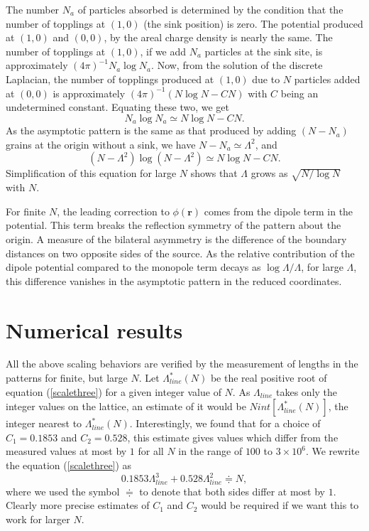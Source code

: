 \documentclass[11pt,a4paper]{book}
\begin{document}
The number $N_a$ of particles absorbed is determined by the condition that the number
of topplings at $(1,0)$ (the sink position) is zero. The potential produced at $(1,0)$ and $(0,0)$, by the
areal charge density is nearly the same. The number of topplings
at $(1,0)$, if we add $N_a$ particles at the sink site, is approximately $\left (4 \pi\right )^{-1} N_a \log N_a$.
Now, from the solution of the discrete Laplacian, the number of topplings produced at
$(1,0)$ due to $N$ particles added at $(0,0)$ is approximately $\left( 4\pi \right)^{-1}\left (N \log N -C N\right )$ with
$C$ being an undetermined constant. Equating these two, we get
\begin{equation}
 N_a \log N_a  \simeq   N \log N - C N.
\label{nans}
\end{equation}
As the asymptotic pattern is the same as that produced by adding $\left( N-N_{a} \right)$
grains at the origin without a sink, we have $N - N_a \simeq \Lambda^2$, and
\begin{equation}
(N -\Lambda^{2})\log ( N -\Lambda^2) \simeq  N \log N - C N.
\label{scaleone}
\end{equation} 
Simplification of this equation for large $N$ shows that $\Lambda$ grows as $\sqrt{N/\log N}$ with $N$. 

For finite $N$, the leading  correction to $\phi\left( \mathbf{r} \right)$ comes from
the dipole term in the potential. This term breaks the reflection 
symmetry of the pattern about the origin. A measure of the bilateral asymmetry is the
difference of the boundary distances on two opposite sides of the source.
As the relative contribution of the dipole potential compared to the monopole
term decays as $\log \Lambda/\Lambda$, for large $\Lambda$, this difference
vanishes in the asymptotic pattern in the reduced coordinates.

\section{Numerical results}\label{ch3.4}
All the above scaling behaviors are verified by the measurement of lengths in the patterns
for finite, but large $N$. Let $\Lambda^{\ast}_{line}\left( N \right)$ be the real positive root of
equation (\ref{scalethree}) for a given integer value of $N$. As
$\Lambda_{line}$ takes only the integer values on the lattice, an estimate of
it would be $Nint\left[ \Lambda^{\ast}_{line}(N) \right]$, the integer nearest
to $\Lambda^{\ast}_{line}\left( N \right)$.
Interestingly, we found that for
a choice of $C_{1}=0.1853$ and $C_{2}=0.528$, this estimate gives
values which differ from the measured values
at most by $1$ for all $N$ in the range of $100$ to $3\times10^{6}$.
We rewrite the equation (\ref{scalethree}) as
\begin{equation}
0.1853\Lambda_{line}^{3}+0.528\Lambda_{line}^{2}\doteqdot N,
\label{scalethreehalf}
\end{equation}
where we used the symbol $\doteqdot$ to denote that both sides differ at most by $1$.
Clearly more precise estimates of $C_{1}$ and $C_{2}$ would be
required if we want this to work for larger $N$.
\end{document}

